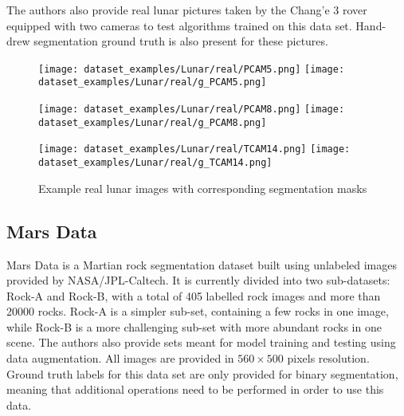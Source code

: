 \documentclass[a4paper,twoside,12pt]{book}
\begin{document}
The authors also provide real lunar pictures taken by the Chang'e 3 rover equipped with two cameras to test algorithms trained on this data set. Hand-drew segmentation ground truth is also present for these pictures.

\begin{figure}[ht!]
    \centering
    \texttt{[image: dataset\_examples/Lunar/real/PCAM5.png]}
    \texttt{[image: dataset\_examples/Lunar/real/g\_PCAM5.png]}

    \texttt{[image: dataset\_examples/Lunar/real/PCAM8.png]}
    \texttt{[image: dataset\_examples/Lunar/real/g\_PCAM8.png]}

    \texttt{[image: dataset\_examples/Lunar/real/TCAM14.png]}
    \texttt{[image: dataset\_examples/Lunar/real/g\_TCAM14.png]}
    \caption{Example real lunar images with corresponding segmentation masks}
    \label{fig:data_real_example1}
\end{figure}

\subsection{Mars Data}
\label{sec:chapter2.1.2}
Mars Data \cite{xiao2021kernel} is a Martian rock segmentation dataset built using unlabeled images provided by NASA/JPL-Caltech. It is currently divided into two sub-datasets: Rock-A and Rock-B, with a total of 405 labelled rock images and more than 20000 rocks. Rock-A is a simpler sub-set, containing a few rocks in one image, while Rock-B is a more challenging sub-set with more abundant rocks in one scene. The authors also provide sets meant for model training and testing using data augmentation. All images are provided in $560 \times 500$ pixels resolution. Ground truth labels for this data set are only provided for binary segmentation, meaning that additional operations need to be performed in order to use this data.
\end{document}

